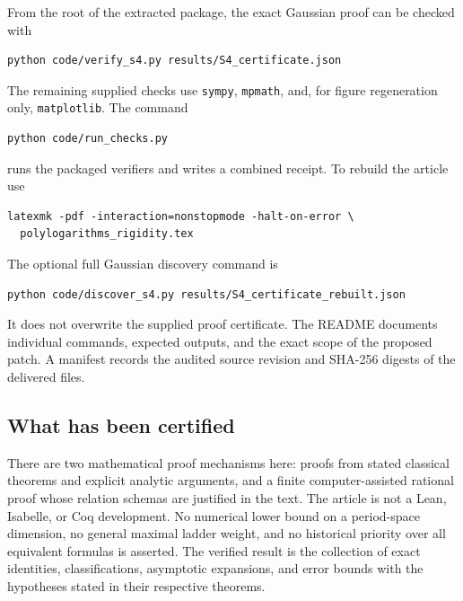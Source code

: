 From the root of the extracted package, the exact Gaussian proof can
be checked with
\begin{verbatim}
python code/verify_s4.py results/S4_certificate.json
\end{verbatim}
The remaining supplied checks use \texttt{sympy}, \texttt{mpmath},
and, for figure regeneration only, \texttt{matplotlib}. The command
\begin{verbatim}
python code/run_checks.py
\end{verbatim}
runs the packaged verifiers and writes a combined receipt. To rebuild
the article use
\begin{verbatim}
latexmk -pdf -interaction=nonstopmode -halt-on-error \
  polylogarithms_rigidity.tex
\end{verbatim}
The optional full Gaussian discovery command is
\begin{verbatim}
python code/discover_s4.py results/S4_certificate_rebuilt.json
\end{verbatim}
It does not overwrite the supplied proof certificate. The README
documents individual commands, expected outputs, and the exact scope
of the proposed patch. A manifest records the audited source revision
and SHA-256 digests of the delivered files.

\subsection{What has been certified}

There are two mathematical proof mechanisms here: proofs from stated
classical theorems and explicit analytic arguments, and a finite
computer-assisted rational proof whose relation schemas are justified
in the text. The article is not a Lean, Isabelle, or Coq development.
No numerical lower bound on a period-space dimension, no general
maximal ladder weight, and no historical priority over all equivalent
formulas is asserted. The verified result is the collection of exact
identities, classifications, asymptotic expansions, and error bounds
with the hypotheses stated in their respective theorems.
